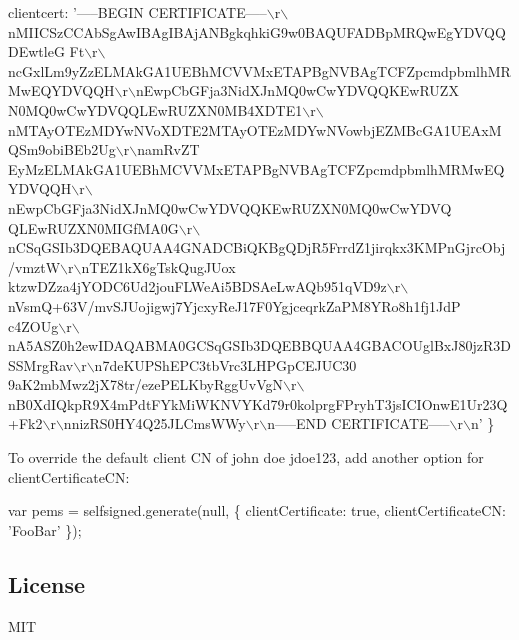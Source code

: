 \begin{DoxyCode}
  clientcert: '-----BEGIN
       CERTIFICATE-----\(\backslash\)r\(\backslash\)nMIICSzCCAbSgAwIBAgIBAjANBgkqhkiG9w0BAQUFADBpMRQwEgYDVQQDEwtleG
      Ft\(\backslash\)r\(\backslash\)ncGxlLm9yZzELMAkGA1UEBhMCVVMxETAPBgNVBAgTCFZpcmdpbmlhMRMwEQYDVQQH\(\backslash\)r\(\backslash\)nEwpCbGFja3NidXJnMQ0wCwYDVQQKEwRUZX
      N0MQ0wCwYDVQQLEwRUZXN0MB4XDTE1\(\backslash\)r\(\backslash\)nMTAyOTEzMDYwNVoXDTE2MTAyOTEzMDYwNVowbjEZMBcGA1UEAxMQSm9obiBEb2Ug\(\backslash\)r\(\backslash\)namRvZT
      EyMzELMAkGA1UEBhMCVVMxETAPBgNVBAgTCFZpcmdpbmlhMRMwEQYDVQQH\(\backslash\)r\(\backslash\)nEwpCbGFja3NidXJnMQ0wCwYDVQQKEwRUZXN0MQ0wCwYDVQ
      QLEwRUZXN0MIGfMA0G\(\backslash\)r\(\backslash\)nCSqGSIb3DQEBAQUAA4GNADCBiQKBgQDjR5FrrdZ1jirqkx3KMPnGjrcObj/vmztW\(\backslash\)r\(\backslash\)nTEZ1kX6gTskQugJUox
      ktzwDZza4jYODC6Ud2jouFLWeAi5BDSAeLwAQb951qVD9z\(\backslash\)r\(\backslash\)nVsmQ+63V/mvSJUojigwj7YjcxyReJ17F0YgjceqrkZaPM8YRo8h1fj1JdP
      c4ZOUg\(\backslash\)r\(\backslash\)nA5ASZ0h2ewIDAQABMA0GCSqGSIb3DQEBBQUAA4GBACOUglBxJ80jzR3DSSMrgRav\(\backslash\)r\(\backslash\)n7deKUPShEPC3tbVrc3LHPGpCEJUC30
      9aK2mbMwz2jX78tr/ezePELKbyRggUvVgN\(\backslash\)r\(\backslash\)nB0XdIQkpR9X4mPdtFYkMiWKNVYKd79r0kolprgFPryhT3jsICIOnwE1Ur23Q+Fk2\(\backslash\)r\(\backslash\)nnizRS0HY4Q25JLCmsWWy\(\backslash\)r\(\backslash\)n-----END CERTIFICATE-----\(\backslash\)r\(\backslash\)n' \}
\end{DoxyCode}


To override the default client CN of {\ttfamily john doe jdoe123}, add another option for {\ttfamily client\+Certificate\+CN}\+:


\begin{DoxyCode}
var pems = selfsigned.generate(null, \{ clientCertificate: true, clientCertificateCN: 'FooBar' \});
\end{DoxyCode}


\subsection*{License}

M\+IT 